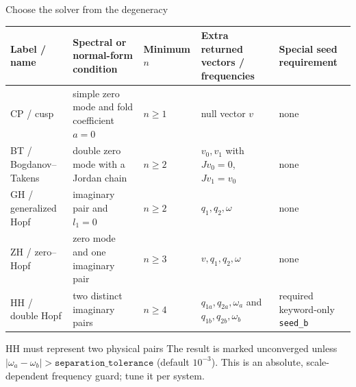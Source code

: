 \begin{frame}{Choose the solver from the degeneracy}
\centering
\renewcommand{\arraystretch}{1.23}
\setlength{\tabcolsep}{2.5pt}
\scriptsize
\begin{tabular}{@{}>{\raggedright\arraybackslash}p{}
                  >{\raggedright\arraybackslash}p{}
                  >{\centering\arraybackslash}p{}
                  >{\raggedright\arraybackslash}p{}
                  >{\raggedright\arraybackslash}p{}@{}}
\toprule
Label / name & Spectral or normal-form condition & Minimum $n$
  & Extra returned vectors / frequencies & Special seed requirement \\
\midrule
CP / cusp & simple zero mode and fold coefficient $a=0$
  & $n\geq1$ & null vector $v$ & none \\
BT / Bogdanov--Takens & double zero mode with a Jordan chain
  & $n\geq2$ & $v_0,v_1$ with $Jv_0=0$, $Jv_1=v_0$ & none \\
GH / generalized Hopf & imaginary pair and $l_1=0$
  & $n\geq2$ & $q_1,q_2,\omega$ & none \\
ZH / zero--Hopf & zero mode and one imaginary pair
  & $n\geq3$ & $v,q_1,q_2,\omega$ & none \\
HH / double Hopf & two distinct imaginary pairs
  & $n\geq4$ & $q_{1a},q_{2a},\omega_a$ and
    $q_{1b},q_{2b},\omega_b$ & required keyword-only \texttt{seed\_b} \\
\bottomrule
\end{tabular}
\vspace{2mm}
\begin{alertblock}{HH must represent two physical pairs}
The result is marked unconverged unless
$|\omega_a-\omega_b|>\texttt{separation\_tolerance}$ (default $10^{-3}$).
This is an absolute, scale-dependent frequency guard; tune it per system.
\end{alertblock}
\end{frame}

